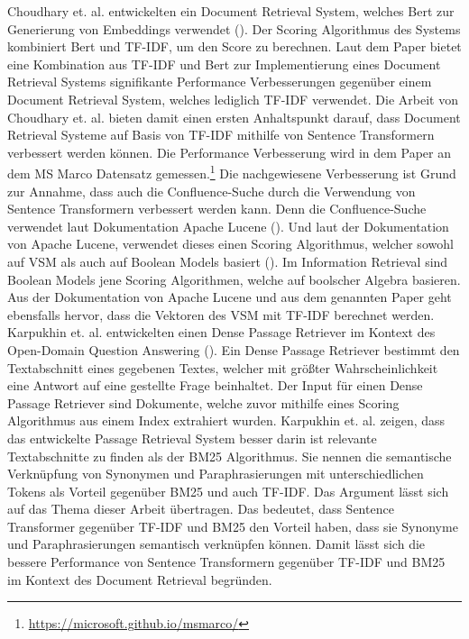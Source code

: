 Choudhary et. al. entwickelten ein Document Retrieval System, welches Bert zur Generierung von Embeddings verwendet (\cite{Choudhary_Guttikonda_Chowdhury_Learmonth_2020}).
Der Scoring Algorithmus des Systems kombiniert Bert und TF-IDF, um den Score zu berechnen.
Laut dem Paper bietet eine Kombination aus TF-IDF und Bert zur Implementierung eines Document Retrieval Systems signifikante Performance Verbesserungen gegenüber einem Document Retrieval System, welches lediglich TF-IDF verwendet.
Die Arbeit von Choudhary et. al. bieten damit einen ersten Anhaltspunkt darauf, dass Document Retrieval Systeme auf Basis von TF-IDF mithilfe von Sentence Transformern verbessert werden können.
Die Performance Verbesserung wird in dem Paper an dem MS Marco Datensatz gemessen.\footnote{\url{https://microsoft.github.io/msmarco/}}
Die nachgewiesene Verbesserung ist Grund zur Annahme, dass auch die Confluence-Suche durch die Verwendung von Sentence Transformern verbessert werden kann.
Denn die Confluence-Suche verwendet laut Dokumentation Apache Lucene (\cite{Confluence_Ranking}).
Und laut der Dokumentation von Apache Lucene, verwendet dieses einen Scoring Algorithmus, welcher sowohl auf VSM als auch auf Boolean Models basiert (\cite{Lucene_Scoring}).
Im Information Retrieval sind Boolean Models jene Scoring Algorithmen, welche auf boolscher Algebra basieren.
Aus der Dokumentation von Apache Lucene und aus dem genannten Paper geht ebensfalls hervor, dass die Vektoren des VSM mit TF-IDF berechnet werden.\\

Karpukhin et. al. entwickelten einen Dense Passage Retriever im Kontext des Open-Domain Question Answering (\cite{Karpukhin_Oguz_Min_Lewis_Wu_Edunov_Chen_Yih_2020}).
Ein Dense Passage Retriever bestimmt den Textabschnitt eines gegebenen Textes, welcher mit größter Wahrscheinlichkeit eine Antwort auf eine gestellte Frage beinhaltet.
Der Input für einen Dense Passage Retriever sind Dokumente, welche zuvor mithilfe eines Scoring Algorithmus aus einem Index extrahiert wurden.
Karpukhin et. al. zeigen, dass das entwickelte Passage Retrieval System besser darin ist relevante Textabschnitte zu finden als der BM25 Algorithmus. 
Sie nennen die semantische Verknüpfung von Synonymen und Paraphrasierungen mit unterschiedlichen Tokens als Vorteil gegenüber BM25 und auch TF-IDF.
Das Argument lässt sich auf das Thema dieser Arbeit übertragen.
Das bedeutet, dass Sentence Transformer gegenüber TF-IDF und BM25 den Vorteil haben, dass sie Synonyme und Paraphrasierungen semantisch verknüpfen können.
Damit lässt sich die bessere Performance von Sentence Transformern gegenüber TF-IDF und BM25 im Kontext des Document Retrieval begründen.\\

